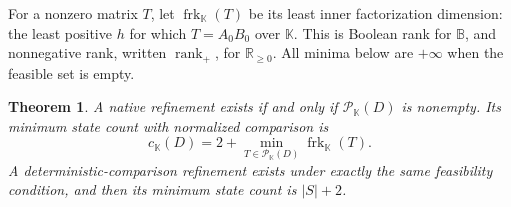 \documentclass[11pt]{article}
\newcommand{\K}{\mathbb K}
\newcommand{\B}{\mathbb B}
\newcommand{\R}{\mathbb R}
\newcommand{\rk}{\operatorname{rank}}
\newcommand{\frk}{\operatorname{frk}}
\newcommand{\Pcal}{\mathcal P}
\newtheorem{theorem}{Theorem}[section]
\theoremstyle{remark}
\begin{document}
For a nonzero matrix $T$, let $\frk_\K(T)$ be its least inner factorization dimension: the least positive $h$ for which $T=A_0B_0$ over $\K$. This is Boolean rank for $\B$, and nonnegative rank, written $\rk_+$, for $\R_{\ge0}$. All minima below are $+\infty$ when the feasible set is empty.

\begin{theorem}\label{thm:cost}
A native refinement exists if and only if $\Pcal_\K(D)$ is nonempty. Its minimum state count with normalized comparison is
\begin{equation}\label{eq:cost}
 c_\K(D)=2+\min_{T\in\Pcal_\K(D)}\frk_\K(T).
\end{equation}
A deterministic-comparison refinement exists under exactly the same feasibility condition, and then its minimum state count is $|S|+2$.
\end{theorem}
\end{document}
